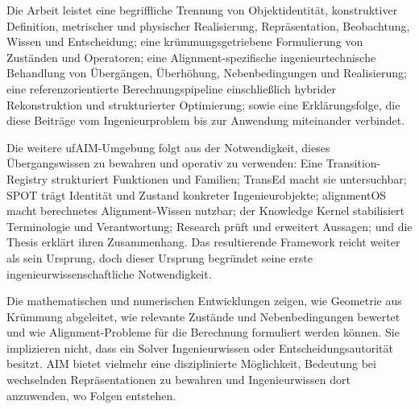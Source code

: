 Die Arbeit leistet eine begriffliche Trennung von Objektidentität,
konstruktiver Definition, metrischer und physischer Realisierung,
Repräsentation, Beobachtung, Wissen und Entscheidung; eine
krümmungsgetriebene Formulierung von Zuständen und Operatoren; eine
Alignment-spezifische ingenieurtechnische Behandlung von Übergängen,
Überhöhung, Nebenbedingungen und Realisierung; eine referenzorientierte
Berechnungspipeline einschließlich hybrider Rekonstruktion und strukturierter
Optimierung; sowie eine Erklärungsfolge, die diese Beiträge vom
Ingenieurproblem bis zur Anwendung miteinander verbindet.

Die weitere ufAIM-Umgebung folgt aus der Notwendigkeit, dieses Übergangswissen
zu bewahren und operativ zu verwenden: Eine Transition-Registry strukturiert
Funktionen und Familien; TransEd macht sie untersuchbar; SPOT trägt Identität
und Zustand konkreter Ingenieurobjekte; alignmentOS macht berechnetes
Alignment-Wissen nutzbar; der Knowledge Kernel stabilisiert Terminologie und
Verantwortung; Research prüft und erweitert Aussagen; und die Thesis erklärt
ihren Zusammenhang. Das resultierende Framework reicht weiter als sein
Ursprung, doch dieser Ursprung begründet seine erste ingenieurwissenschaftliche
Notwendigkeit.

Die mathematischen und numerischen Entwicklungen zeigen, wie Geometrie aus
Krümmung abgeleitet, wie relevante Zustände und Nebenbedingungen bewertet und
wie Alignment-Probleme für die Berechnung formuliert werden können. Sie
implizieren nicht, dass ein Solver Ingenieurwissen oder Entscheidungsautorität
besitzt. AIM bietet vielmehr eine disziplinierte Möglichkeit, Bedeutung bei
wechselnden Repräsentationen zu bewahren und Ingenieurwissen dort anzuwenden,
wo Folgen entstehen.
